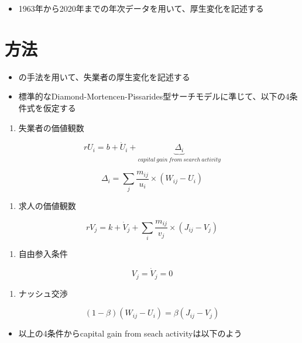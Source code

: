 \documentclass[
]{book}
\providecommand{\tightlist}{%
  \setlength{\itemsep}{0pt}\setlength{\parskip}{0pt}}
\begin{document}
\begin{itemize}
\tightlist
\item
  1963年から2020年までの年次データを用いて、厚生変化を記述する
\end{itemize}

\hypertarget{ux65b9ux6cd5-1}{%
\section{方法}\label{ux65b9ux6cd5-1}}

\begin{itemize}
\item
  \citet{kawata2021first} の手法を用いて、失業者の厚生変化を記述する
\item
  標準的なDiamond-Mortencen-Pissarides型サーチモデル\citep{rogerson2005search}に準じて、以下の4条件式を仮定する
\end{itemize}

\begin{enumerate}
\def\labelenumi{\arabic{enumi}.}
\tightlist
\item
  失業者の価値観数
\end{enumerate}

\[rU_i=b+\dot{U}_i+\underbrace{\Delta_i}_{capital\ gain\ from\ search\ activity}\]

\[\Delta_i = \sum_j\frac{m_{ij}}{u_i}\times (W_{ij}-U_i)\]

\begin{enumerate}
\def\labelenumi{\arabic{enumi}.}
\setcounter{enumi}{1}
\tightlist
\item
  求人の価値観数
\end{enumerate}

\[rV_j=k+\dot{V}_j+\sum_{i}\frac{m_{ij}}{v_j}\times (J_{ij}-V_j)\]

\begin{enumerate}
\def\labelenumi{\arabic{enumi}.}
\setcounter{enumi}{2}
\tightlist
\item
  自由参入条件
\end{enumerate}

\[V_j=\dot{V}_j=0\]

\begin{enumerate}
\def\labelenumi{\arabic{enumi}.}
\setcounter{enumi}{3}
\tightlist
\item
  ナッシュ交渉
\end{enumerate}

\[(1-\beta)(W_{ij}-U_i)=\beta(J_{ij}-V_j)\]

\begin{itemize}
\tightlist
\item
  以上の4条件からcapital gain from seach activityは以下のよう
\end{itemize}
\end{document}
